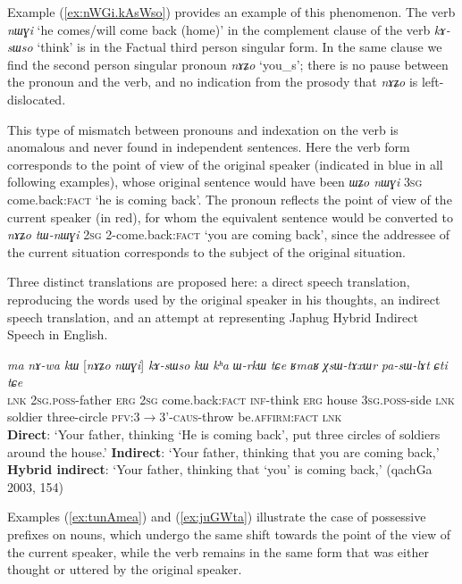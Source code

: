 \documentclass[oneside,a4paper,11pt]{article}
\newcommand{\ipa}[1]{\textit{\phon#1}}
\newcommand{\bleu}[1]{{\color{blue}#1}}
\newcommand{\rouge}[1]{{\color{red}#1}}
\newcommand{\refb}[1]{(\ref{#1})}
\begin{document}
Example \refb{ex:nWGi.kAsWso} provides an example of this phenomenon. The verb \ipa{nɯɣi} `he comes/will come back (home)' in the complement clause of the verb \ipa{kɤ-sɯso} `think' is in the Factual third person singular form. In the same clause we find the second person singular pronoun \ipa{nɤʑo} `you_s'; there is no pause between the pronoun and the verb, and no indication from the prosody that \ipa{nɤʑo} is left-dislocated. 

This type of mismatch between pronouns and indexation on the verb is anomalous and never found in independent sentences. Here the verb form corresponds to the point of view of the original speaker (indicated in blue in all following examples), whose original sentence would have been \ipa{ɯʑo nɯɣi} \textsc{3sg} {come.back:\textsc{fact}} `he is coming back'. The pronoun reflects the point of view of the current speaker (in red), for whom the equivalent sentence would be converted to \ipa{nɤʑo tɯ-nɯɣi} \textsc{2sg} {2-come.back:\textsc{fact}} `you are coming back', since the addressee of the current situation corresponds to the subject of the original situation.

Three distinct translations are proposed here: a direct speech translation, reproducing the words used by the original speaker in his thoughts, an indirect speech translation, and an attempt at representing Japhug Hybrid Indirect Speech in English.

\begin{exe}
\ex \label{ex:nWGi.kAsWso}
\gll 
\ipa{ma} \ipa{nɤ-wa}  	\ipa{kɯ}  	[\rouge{\ipa{nɤʑo}} 	\bleu{\ipa{nɯɣi}}]  	\ipa{kɤ-sɯso}  	\ipa{kɯ}  	\ipa{kʰa}  	\ipa{ɯ-rkɯ} \ipa{tɕe} 	\ipa{ʁmaʁ}  	\ipa{χsɯ-tɤxɯr}  	\ipa{pa-sɯ-lɤt}  	\ipa{ɕti}  	\ipa{tɕe}  \\
\textsc{lnk} \textsc{2sg.poss}-father \textsc{erg} \textsc{2sg} {come.back:\textsc{fact}}  \textsc{inf}-think \textsc{erg} house \textsc{3sg.poss}-side \textsc{lnk} soldier three-circle \textsc{pfv:3$\rightarrow$3'-caus}-throw be.\textsc{affirm}:\textsc{fact} \textsc{lnk}\\
\glt \textbf{Direct}: `Your father, thinking `\bleu{He is coming back}',   put three circles of soldiers around the house.' 
\glt  \textbf{Indirect}: `Your father, thinking that \rouge{you are coming back},'
\glt  \textbf{Hybrid indirect}: `Your father, thinking that `\rouge{you}' \bleu{is coming back},' (qachGa 2003, 154)
\end{exe}
   
Examples \refb{ex:tunAmea} and \refb{ex:juGWta} illustrate the case of possessive prefixes on nouns, which undergo the same shift towards the point of the view of the current speaker, while the verb remains in the same form that was either thought or uttered by the original speaker.
\end{document}
